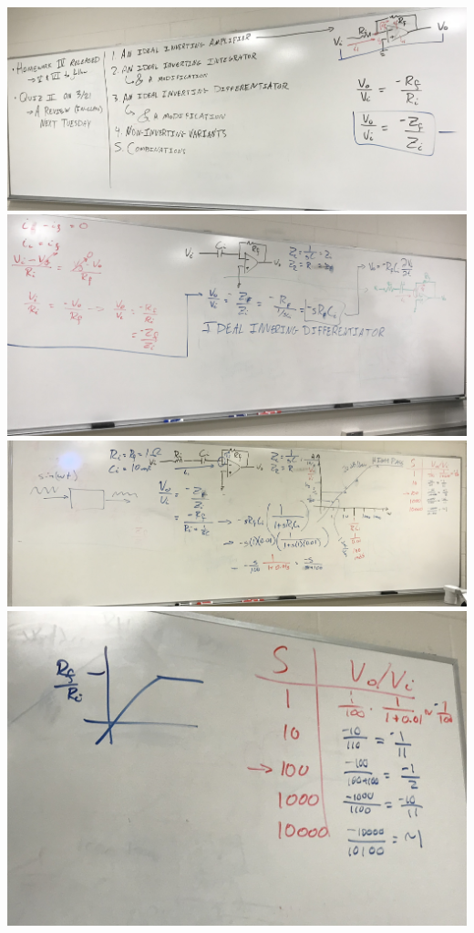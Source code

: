 \documentclass[11pt]{book}
\begin{document}
\includegraphics[width=\textwidth]{figures/3-14-19_Fig.1.jpg}
\\
\includegraphics[width=\textwidth]{figures/3-14-19_Fig.2.jpg}
\\
\includegraphics[width=\textwidth]{figures/3-14-19_Fig.3.jpg}
\\
\includegraphics[width=\textwidth]{figures/3-14-19_Fig.3.5.jpg}
\end{document}
